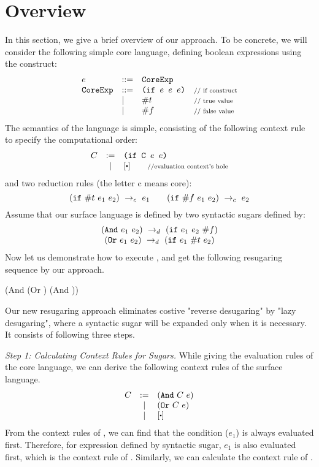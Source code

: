 \section{Overview}
\label{sec2}


In this section, we give a brief overview of our approach. To be concrete, we will consider the following simple core language, defining boolean expressions using the  construct:
\[
\begin{array}{lllll}
e &::=& \mbox{\tt CoreExp}\\
\mbox{\tt CoreExp} &::=& \texttt{(if~$e$~$e$~$e$)} &\mbox{{\scriptsize // if construct}}\\
& |& \#t  & \mbox{{\scriptsize // true value}}\\
& |& \#f & \mbox{{\scriptsize // false value}}
\end{array}
\]
The semantics of the language is simple, consisting of the following context rule to specify the computational order:
\[
\begin{array}{lcl}
C &:=& \Code{(if C $e$ $e$)}\\
&|&[\bigcdot] \qquad \note{//evaluation context's hole}\\
\end{array}
\]
and two reduction rules (the letter c means core):
\[
\centering
 \redc{(\m{if}~\true~e_1~e_2)}{e_1}  \qquad \redc{(\m{if}~\false~e_1~e_2)}{e_2}
\]
Assume that our surface language is defined by two syntactic sugars defined by:
\[
\begin{array}{c}
(\mbox{\tt And}~e_1~e_2) ~\rightarrow_d~ (\mbox{\tt if}~e_1~e_2~\#f)\\
(\mbox{\tt Or}~e_1~e_2) ~\rightarrow_d~ (\mbox{\tt if}~e_1~\#t~e_2)
\end{array}
\]
Now let us demonstrate how to execute , and get the following resugaring sequence by our approach.
{\small
\begin{Codes}
    (And (Or \true \false) (And \false \true))
\end{Codes}
}

Our new resugaring approach eliminates costive "reverse desugaring" by "lazy desugaring", where a syntactic sugar will be expanded only when it is necessary. It consists of following three steps.

{\em Step 1: Calculating Context Rules for Sugars.}
While giving the evaluation rules of the core language, we can derive the following context rules of the surface language.
\[
\begin{array}{lcl}
C &:=& (\m{And}~C~e)\\
&|& (\m{Or}~C~e)\\
&|&[\bigcdot]\\
\end{array}
\]
From the context rules of , we can find that the condition ($e_1$) is always evaluated first. Therefore, for expression  defined by syntactic sugar, $e_1$ is also evaluated first, which is the context rule of . Similarly, we can calculate the context rule of .

